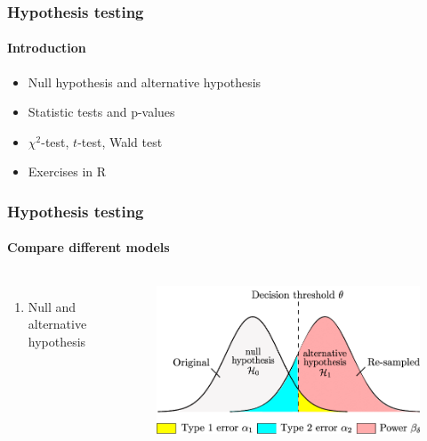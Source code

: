 \documentclass[aspectratio=43]{beamer}
\begin{document}
%
%

\begin{frame}


\end{frame}

\begin{frame}
	
	\frametitle{Hypothesis testing}
	\framesubtitle{Introduction}
	
	\footnotesize
	
	\begin{itemize}
		\item Null hypothesis and alternative hypothesis
		\item Statistic tests and p-values
		\item $\chi^{2}$-test, $t$-test, Wald test
		\item Exercises in R
	\end{itemize}

\end{frame}

\begin{frame}
	
	\frametitle{Hypothesis testing}
	\framesubtitle{Compare different models}
	
	\footnotesize
	
	\begin{columns}
		
		
		\begin{enumerate}
		\item Null and alternative hypothesis
		\end{enumerate}
		
		
		\begin{figure}[!htb]
		\includegraphics[width = \linewidth]{plots/part3/hypothesis.png}
		\end{figure}
	
	\end{columns}

\end{frame}
\end{document}

